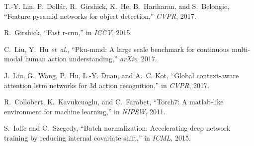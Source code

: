 \documentclass[10pt,twocolumn,letterpaper]{article}
\begin{document}
\begin{thebibliography}{10}
   T.-Y. Lin, P.~Doll{\'a}r, R.~Girshick, K.~He, B.~Hariharan, and S.~Belongie,
     ``Feature pyramid networks for object detection,'' \emph{CVPR}, 2017.
   
   R.~Girshick, ``Fast r-cnn,'' in \emph{ICCV}, 2015.
   
   C.~Liu, Y.~Hu \emph{et~al.}, ``Pku-mmd: A large scale benchmark for continuous
     multi-modal human action understanding,'' \emph{arXiv}, 2017.
   
   J.~Liu, G.~Wang, P.~Hu, L.-Y. Duan, and A.~C. Kot, ``Global context-aware
     attention lstm networks for 3d action recognition,'' in \emph{CVPR}, 2017.
   
   R.~Collobert, K.~Kavukcuoglu, and C.~Farabet, ``Torch7: A matlab-like
     environment for machine learning,'' in \emph{NIPSW}, 2011.
   
   S.~Ioffe and C.~Szegedy, ``Batch normalization: Accelerating deep network
     training by reducing internal covariate shift,'' in \emph{ICML}, 2015.
   
   \end{thebibliography}
\end{document}
